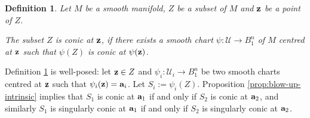 \documentclass[11pt]{amsart}
\newtheorem{proposition}[theorem]{Proposition}
\newtheorem{definition}[theorem]{Definition}
\newcommand{\field}[1]{\mathbb{#1}}
\newcommand{\R}{\field{R}}
\newcommand{\ba}{{\bf a}}
\newcommand{\bz}{{\bf z}}
\newcommand{\cU}{\mathcal{U}}
\newcommand{\ff}{{\rm ff}}
\newcommand{\Rn}{{\R^n}}
\numberwithin{equation}{section}
\numberwithin{equation}{section}
\begin{document}
%	
%	
%	
% 
% 


%
%
%
%
%


%
%
\begin{definition}\label{def:conic-abstract}
	Let $M$ be a smooth manifold, $Z$ be a subset of $M$
	and $\bz$ be a point of $Z$. 
	
	
	The subset $Z$ is \em conic at $\bz$, \em if there exists a smooth 
	chart $\psi: \cU \to B_1^n$ of $M$ centred at $\bz$ such that $\psi(Z)$ is conic at 
	$\psi(\bz)$.
	
\end{definition}


Definition \ref{def:conic-abstract} is well-posed: let $\bz\in Z$ and $\psi_i:\cU_i \to B_1^n$
be two smooth charts centred at $\bz$ such that $\psi_i(\bz) = \ba_i$. 
Let $S_i := \psi_i(Z)$. Proposition \ref{prop:blow-up-intrinsic} 
implies that $S_1$ is conic at $\ba_1$ if and only if $S_2$ is 
conic at $\ba_2$, and similarly $S_1$ is singularly conic at $\ba_1$
if and only if $S_2$ is singularly conic at $\ba_2$. 
\end{document}
